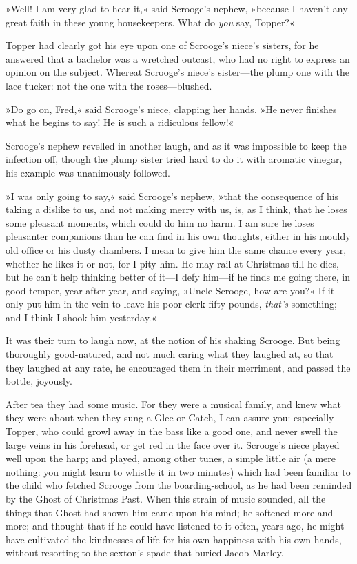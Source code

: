 »Well! I am very glad to hear it,« said Scrooge's nephew, »because I haven't any great faith in these young housekeepers. What do \textit{you} say, Topper?«

Topper had clearly got his eye upon one of Scrooge's niece's sisters, for he answered that a bachelor was a wretched outcast, who had no right to express an opinion on the subject. Whereat Scrooge's niece's sister---the plump one with the lace tucker: not the one with the roses---blushed.

»Do go on, Fred,« said Scrooge's niece, clapping her hands. »He never finishes what he begins to say! He is such a ridiculous fellow!«

Scrooge's nephew revelled in another laugh, and as it was impossible to keep the infection off, though the plump sister tried hard to do it with aromatic vinegar, his example was unanimously followed.

»I was only going to say,« said Scrooge's nephew, »that the consequence of his taking a dislike to us, and not making merry with us, is, as I think, that he loses some pleasant moments, which could do him no harm. I am sure he loses pleasanter companions than he can find in his own thoughts, either in his mouldy old office or his dusty chambers. I mean to give him the same chance every year, whether he likes it or not, for I pity him. He may rail at Christmas till he dies, but he can't help thinking better of it---I defy him---if he finds me going there, in good temper, year after year, and saying, »Uncle Scrooge, how are you?« If it only put him in the vein to leave his poor clerk fifty pounds, \textit{that's} something; and I think I shook him yesterday.«

It was their turn to laugh now, at the notion of his shaking Scrooge. But being thoroughly good-natured, and not much car\-ing what they laughed at, so that they laughed at any rate, he encouraged them in their merriment, and passed the bottle, joyously.

After tea they had some music. For they were a musical family, and knew what they were about when they sung a Glee or Catch, I can assure you: especially Topper, who could growl away in the bass like a good one, and never swell the large veins in his forehead, or get red in the face over it. Scrooge's niece played well upon the harp; and played, among other tunes, a simple little air (a mere nothing: you might learn to whistle it in two minutes) which had been familiar to the child who fetched Scrooge from the boarding-school, as he had been reminded by the Ghost of Christmas Past. When this strain of music sounded, all the things that Ghost had shown him came upon his mind; he softened more and more; and thought that if he could have listened to it often, years ago, he might have cultivated the kindnesses of life for his own happiness with his own hands, without resorting to the sexton's spade that buried Jacob Marley.

